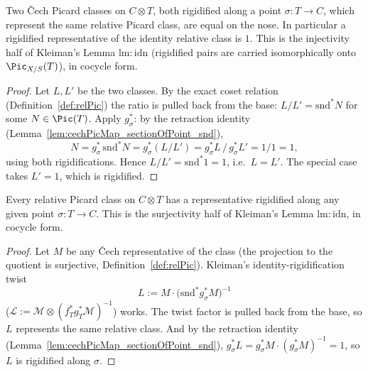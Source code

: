 \begin{theorem}
  \label{thm:isRigidified_eq_of_relPicMk_eq}
  \leanok
  Two \v Cech Picard classes on \(C \otimes T\), both rigidified along a point
  \(\sigma \colon T \to C\), which represent the same relative Picard class, are equal on the
  nose. In particular a rigidified representative of the identity relative class is \(1\).
  This is the injectivity half of Kleiman's Lemma \(\mathrm{lm{:}idn}\) (rigidified pairs are
  carried isomorphically onto \(\Pic_{X/S}(T)\)), in cocycle form.
\end{theorem}
\begin{proof}
  \leanok
  Let \(L, L'\) be the two classes. By the exact coset relation
  (Definition~\ref{def:relPic}) the ratio is pulled back from the base: \(L/L' =
  \mathrm{snd}^{*} N\) for some \(N \in \Pic(T)\). Apply \(g_\sigma^{*}\): by the retraction
  identity (Lemma~\ref{lem:cechPicMap_sectionOfPoint_snd}),
  \[
    N = g_\sigma^{*}\,\mathrm{snd}^{*} N = g_\sigma^{*}(L/L')
      = g_\sigma^{*}L \,/\, g_\sigma^{*}L' = 1/1 = 1 ,
  \]
  using both rigidifications. Hence \(L/L' = \mathrm{snd}^{*}1 = 1\), i.e.\ \(L = L'\). The
  special case takes \(L' = 1\), which is rigidified.
\end{proof}

\begin{theorem}
  \label{thm:relPic_exists_isRigidified_rep}
  \leanok
  Every relative Picard class on \(C \otimes T\) has a representative rigidified along any
  given point \(\sigma \colon T \to C\). This is the surjectivity half of Kleiman's Lemma
  \(\mathrm{lm{:}idn}\), in cocycle form.
\end{theorem}
\begin{proof}
  \leanok
  Let \(M\) be any \v Cech representative of the class (the projection to the quotient is
  surjective, Definition~\ref{def:relPic}). Kleiman's identity-rigidification twist
  \[
    L := M \cdot \bigl(\mathrm{snd}^{*} g_\sigma^{*} M\bigr)^{-1}
  \]
  (\(\mathcal L := \mathcal M \otimes (f_T^{*} g_T^{*} \mathcal M)^{-1}\)) works. The twist factor is pulled
  back from the base, so \(L\) represents the same relative class. And by the retraction
  identity (Lemma~\ref{lem:cechPicMap_sectionOfPoint_snd}),
  \(g_\sigma^{*} L = g_\sigma^{*} M \cdot (g_\sigma^{*} M)^{-1} = 1\), so \(L\) is
  rigidified along \(\sigma\).
\end{proof}

